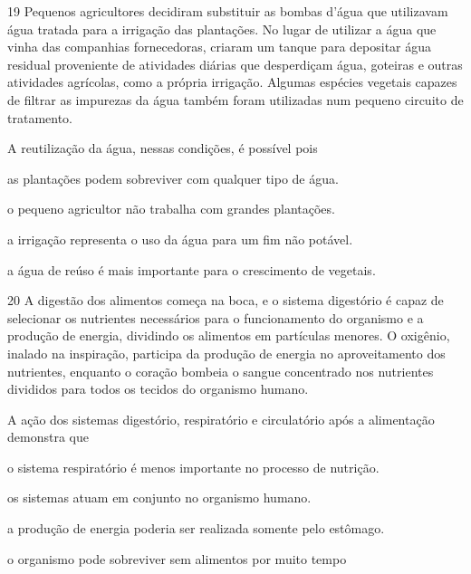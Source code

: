 \num{19} Pequenos agricultores decidiram substituir as bombas d'água
que utilizavam água tratada para a irrigação das plantações. No lugar de
utilizar a água que vinha das companhias fornecedoras, criaram um tanque
para depositar água residual proveniente de atividades diárias que
desperdiçam água, goteiras e outras atividades agrícolas, como a própria
irrigação. Algumas espécies vegetais capazes de filtrar as impurezas da
água também foram utilizadas num pequeno circuito de tratamento.

A reutilização da água, nessas condições, é possível pois

\begin{escolha}
\item as plantações podem sobreviver com qualquer tipo de água.

\item o pequeno agricultor não trabalha com grandes plantações.

\item a irrigação representa o uso da água para um fim não potável.

\item a água de reúso é mais importante para o crescimento de vegetais.
\end{escolha}


\num{20} A digestão dos alimentos começa na boca, e o sistema
digestório é capaz de selecionar os nutrientes necessários para o
funcionamento do organismo e a produção de energia, dividindo os
alimentos em partículas menores. O oxigênio, inalado na inspiração,
participa da produção de energia no aproveitamento dos nutrientes,
enquanto o coração bombeia o sangue concentrado nos nutrientes divididos
para todos os tecidos do organismo humano.

A ação dos sistemas digestório, respiratório e circulatório após a
alimentação demonstra que

\begin{escolha}
\item o sistema respiratório é menos importante no processo de nutrição.

\item os sistemas atuam em conjunto no organismo humano.

\item a produção de energia poderia ser realizada somente pelo estômago.

\item o organismo pode sobreviver sem alimentos por muito tempo
\end{escolha}

